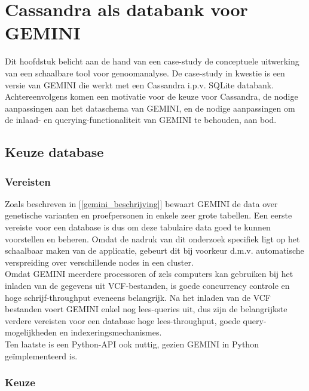 \chapter{Cassandra als databank voor GEMINI}
\label{concept}

Dit hoofdstuk belicht aan de hand van een case-study de conceptuele uitwerking van een schaalbare tool voor genoomanalyse. De case-study in kwestie is een versie van GEMINI die werkt met een Cassandra i.p.v. SQLite databank. Achtereenvolgens komen een motivatie voor de keuze voor Cassandra, de nodige aanpassingen aan het dataschema van GEMINI, en de nodige aanpassingen om de inlaad- en querying-functionaliteit van GEMINI te behouden, aan bod.

\section{Keuze database}

\subsection{Vereisten}

Zoals beschreven in [\ref{gemini_beschrijving}] bewaart GEMINI de data over genetische varianten en proefpersonen in enkele zeer grote tabellen. Een eerste vereiste voor een database is dus om deze tabulaire data goed te kunnen voorstellen en beheren. Omdat de nadruk van dit onderzoek specifiek ligt op het schaalbaar maken van de applicatie, gebeurt dit bij voorkeur d.m.v. automatische verspreiding over verschillende nodes in een cluster.\\
Omdat GEMINI meerdere processoren of zels computers kan gebruiken bij het inladen van de gegevens uit VCF-bestanden, is goede concurrency controle en hoge schrijf-throughput eveneens belangrijk. Na het inladen van de VCF bestanden voert GEMINI enkel nog lees-queries uit, dus zijn de belangrijkste verdere vereisten voor een database hoge lees-throughput, goede query-mogelijkheden en indexeringsmechanismes.
\\Ten laatste is een Python-API ook nuttig, gezien GEMINI in Python ge\"implementeerd is.

\subsection{Keuze}

